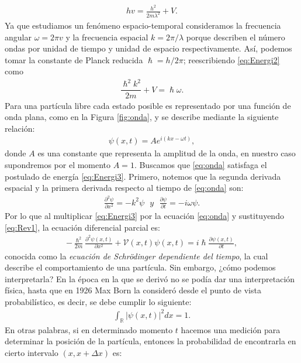 \documentclass[12pt]{article}
\theoremstyle{definition}
\newcommand*{\field}[1]{\mathbb{#1}}
\begin{document}
\begin{align}
    hv = \frac{h^2}{2m\lambda^2} + V.
    \label{eq:Energi2}
\end{align}
Ya que estudiamos un fenómeno espacio-temporal consideramos
la frecuencia angular $\omega = 2\pi v$ y la frecuencia espacial $k =2\pi/\lambda$ porque describen el número ondas por unidad de tiempo y unidad de espacio respectivamente. Así, podemos tomar la constante de Planck reducida $\hslash = h/2\pi$; reescribiendo \eqref{eq:Energi2} como
\begin{align}
    \dfrac{\hslash^2k^2}{2m} + V  = \hslash\omega.
    \label{eq:Energi3}
\end{align}
 Para una partícula libre cada estado posible es representado por una función de onda plana, como en la Figura  \ref{fig:onda}, y se describe mediante la siguiente relación:
\begin{align}
    \psi(x,t) = Ae^{i(kx - \omega t)},
    \label{eq:onda}
\end{align}
donde $A$ es una constante que representa la amplitud de la onda, en nuestro caso supondremos por el momento $A = 1$. Buscamos que \eqref{eq:onda} satisfaga el postulado de energía \eqref{eq:Energi3}. Primero, notemos que la segunda derivada espacial y la primera derivada respecto al tiempo de \eqref{eq:onda} son:
\begin{align}
    \frac{\partial^2\psi}{\partial x^2} = -k^2\psi\:\:\: y\:\:\: \frac{\partial \psi}{\partial t} = -i\omega\psi.
    \label{eq:Rev1}
\end{align}
Por lo que al multiplicar \eqref{eq:Energi3} por la ecuación \eqref{eq:onda}
y sustituyendo \eqref{eq:Rev1}, la ecuación diferencial parcial es:
\begin{align*}
    -\frac{\hslash^2}{2m}\frac{\partial^2\psi(x,t)}{\partial x^2} + \mathcal{V}(x,t)\psi(x,t) = i\hslash\frac{\partial\psi(x,t)}{\partial t},
\end{align*}
conocida como la {\it ecuación de Schrödinger dependiente del tiempo}, la cual describe el comportamiento de una partícula. Sin embargo, ¿cómo podemos interpretarla? En la época en la que se derivó no se podía dar una interpretación física, hasta que en 1926 Max Born la consideró desde el punto de vista probabilístico, es decir, se debe cumplir lo siguiente:
\begin{align}
    \int_{\field{R}}|\psi(x,t)|^2 dx= 1.
    \label{eq:Rev2}
\end{align}
En otras palabras, si en determinado momento $t$ hacemos una medición para determinar la posición de la partícula, entonces la probabilidad de encontrarla en cierto intervalo $(x, x + \Delta x)$ es:
\end{document}
